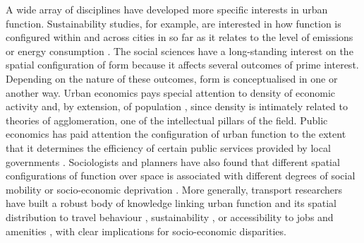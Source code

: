 A wide array of disciplines have developed more specific interests in urban
function.
Sustainability studies, for example, are interested in how function is
configured within and across cities in so far as it relates to the level of
emissions \citep{angel2018shape} or energy consumption \citep{silva2017urban}.
The social sciences have a long-standing interest on the spatial
configuration of form because it affects several outcomes of prime interest.
Depending on the nature of these outcomes, form is conceptualised in one or
another way.
Urban economics pays special attention to density of economic activity and, by
extension, of population \citep{ahlfeldt2019, duranton2020economics}, since
density is intimately related to theories of agglomeration, one of the
intellectual pillars of the field.
Public economics has paid attention the
configuration of urban function to the extent that it determines the
efficiency of certain public services provided by local governments
\citep{carruthers2003urban, hortas2010does}.
Sociologists and planners have also found that different spatial configurations of function
over space is associated with different degrees of social mobility
\citep{ewing2016does} or socio-economic deprivation
\citep{venerandi2018scalable}.
More generally, transport researchers have built a robust body of knowledge
linking urban function and its spatial distribution to travel behaviour
\citep{boarnet2001travel}, sustainability \citep{sevtuk2020does}, or accessibility
to jobs \citep{horner2004exploring} and amenities \citep{diamond2013economics}, with clear implications for socio-economic disparities.


